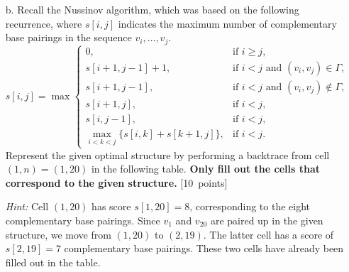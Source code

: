 \begin{enumerate}
{{\begin{center}
\begin{tabular}{|c|c|c|c|c|c|c|c|c|c|c|c|c|c|c|c|c|c|c|c|c|c|}
        \hline
    \end{tabular}
\end{center}
}}

\newpage
\begin{itemize}
\item[b.] Recall the Nussinov algorithm, which was based on the following recurrence, where $s[i,j]$ indicates the maximum number of complementary base pairings in the sequence $v_i,\ldots,v_j$.
\begin{equation}
s[i,j] = \max
\begin{cases}
  0, & \mbox{if $i \ge j$,}\\
  s[i+1,j-1] + 1, & \mbox{if $i < j$ and $(v_i,v_j) \in \Gamma$,}\\
  s[i+1,j-1], & \mbox{if $i < j$ and $(v_i,v_j) \not \in \Gamma$,}\\
  s[i+1,j], & \mbox{if $i < j$,}\\
  s[i,j-1], & \mbox{if $i < j$,}\\
  \max_{i < k < j}\{s[i,k]+s[k+1,j]\}, & \mbox{if $i < j$.}
\end{cases}
\end{equation}
Represent the given optimal structure by performing a backtrace from cell $(1,n) = (1,20)$ in the following table.
\textbf{Only fill out the cells that correspond to the given structure.} [10~points]

\emph{Hint:} Cell $(1,20)$ has score $s[1,20] = 8$, corresponding to the eight complementary base pairings. Since $v_1$ and $v_{20}$ are paired up in the given structure, we move from $(1,20)$ to $(2,19)$. The latter cell has a score of $s[2,19] = 7$ complementary base pairings. These two cells have already been filled out in the table.
\end{itemize}
\end{enumerate}


